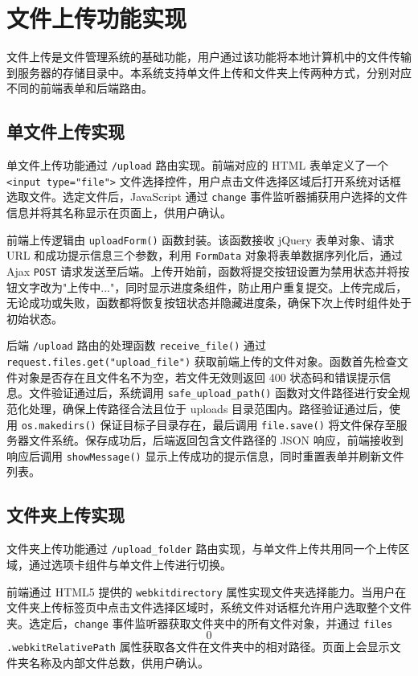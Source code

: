 \documentclass[UTF8,zihao=-4]{ctexrep}
\begin{document}
\section{文件上传功能实现}

文件上传是文件管理系统的基础功能，用户通过该功能将本地计算机中的文件传输到服务器的存储目录中。本系统支持单文件上传和文件夹上传两种方式，分别对应不同的前端表单和后端路由。

\subsection{单文件上传实现}

单文件上传功能通过 \texttt{/upload} 路由实现。前端对应的 HTML 表单定义了一个 \verb|<input type="file">| 文件选择控件，用户点击文件选择区域后打开系统对话框选取文件。选定文件后，JavaScript 通过 \texttt{change} 事件监听器捕获用户选择的文件信息并将其名称显示在页面上，供用户确认。

前端上传逻辑由 \texttt{uploadForm()} 函数封装。该函数接收 jQuery 表单对象、请求 URL 和成功提示信息三个参数，利用 \texttt{FormData} 对象将表单数据序列化后，通过 Ajax \texttt{POST} 请求发送至后端。上传开始前，函数将提交按钮设置为禁用状态并将按钮文字改为"上传中..."，同时显示进度条组件，防止用户重复提交。上传完成后，无论成功或失败，函数都将恢复按钮状态并隐藏进度条，确保下次上传时组件处于初始状态。

后端 \texttt{/upload} 路由的处理函数 \texttt{receive\_file()} 通过 \texttt{request.files.get("upload\_file")} 获取前端上传的文件对象。函数首先检查文件对象是否存在且文件名不为空，若文件无效则返回 400 状态码和错误提示信息。文件验证通过后，系统调用 \texttt{safe\_upload\_path()} 函数对文件路径进行安全规范化处理，确保上传路径合法且位于 uploads 目录范围内。路径验证通过后，使用 \texttt{os.makedirs()} 保证目标子目录存在，最后调用 \texttt{file.save()} 将文件保存至服务器文件系统。保存成功后，后端返回包含文件路径的 JSON 响应，前端接收到响应后调用 \texttt{showMessage()} 显示上传成功的提示信息，同时重置表单并刷新文件列表。

\subsection{文件夹上传实现}

文件夹上传功能通过 \texttt{/upload\_folder} 路由实现，与单文件上传共用同一个上传区域，通过选项卡组件与单文件上传进行切换。

前端通过 HTML5 提供的 \texttt{webkitdirectory} 属性实现文件夹选择能力。当用户在文件夹上传标签页中点击文件选择区域时，系统文件对话框允许用户选取整个文件夹。选定后，\texttt{change} 事件监听器获取文件夹中的所有文件对象，并通过 \texttt{files\[0\].webkitRelativePath} 属性获取各文件在文件夹中的相对路径。页面上会显示文件夹名称及内部文件总数，供用户确认。
\end{document}
